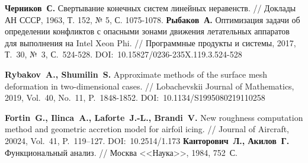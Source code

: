 \begin{thebibliography}{99}
%
%






%
%






% 
\textbf{Черников~С.} Свертывание конечных систем линейных неравенств. // Доклады АН СССР, 1963, Т. 152, № 5, С. 1075-1078.
%
\textbf{Рыбаков~А.} Оптимизация задачи об определении конфликтов с опасными зонами движения летательных аппаратов для выполнения на Intel Xeon Phi. // Программные продукты и системы, 2017, Т.~30, №~3, С.~524-528.
DOI:~10.15827/0236-235X.119.3.524-528
%



%
\textbf{Rybakov~A., Shumilin~S.} Approximate methods of the surface mesh deformation in two-dimensional cases. // Lobachevskii Journal of Mathematics, 2019, Vol.~40, No.~11, P.~1848-1852. DOI:~10.1134/S1995080219110258

\textbf{Fortin~G., Ilinca~A., Laforte~J.-L., Brandi~V.} New roughness computation method and geometric accretion model for airfoil icing. // Journal of Aircraft, 20024, Vol.~41, P.~119–127. DOI:~10.2514/1.173
%
\textbf{Канторович~Л., Акилов~Г.} Функциональный анализ. // Москва <<Наука>>, 1984, 752~С.
%




\end{thebibliography}
